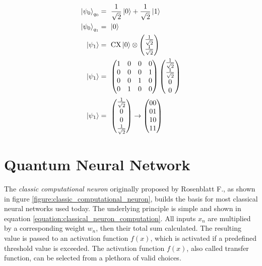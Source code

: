 \begin{equation}
    \centering
    \begin{split}
    \ket{\psi_0}_{q_0} &=\ \frac{1}{\sqrt{2}}\ket{0} + \frac{1}{\sqrt{2}}\ket{1}\\
    \ket{\psi_0}_{q_1} &=\ \ket{0}\\
    \ket{\psi_1} &=\ \mathrm{CX}\ket{0}\otimes\begin{pmatrix}\frac{1}{\sqrt{2}} \\ \frac{1}{\sqrt{2}}\end{pmatrix} \\
    \ket{\psi_1} &=\ \begin{pmatrix}
    1 & 0 & 0 & 0\\
    0 & 0 & 0 & 1\\
    0 & 0 & 1 & 0\\
    0 & 1 & 0 & 0\\
    \end{pmatrix}\begin{pmatrix}\frac{1}{\sqrt{2}} \\ \frac{1}{\sqrt{2}} \\ 0 \\ 0\end{pmatrix} \\
    \ket{\psi_1} &=\ \begin{pmatrix}\frac{1}{\sqrt{2}} \\ 0 \\ 0 \\ \frac{1}{\sqrt{2}}\end{pmatrix} \rightarrow \begin{pmatrix}00 \\ 01 \\ 10 \\ 11\end{pmatrix}
    \end{split}
    \label{equation:states_cx_circuit}
\end{equation}




\newpage

\section{Quantum Neural Network}
\label{chapter:qnn}

The \textit{classic computational neuron} originally proposed by Rosenblatt F.\cite{rosenblatt_perceptron_1958}, as shown in figure \ref{figure:classic_computational_neuron}, builds the basis for most classical neural networks used today. The underlying principle is simple and shown in equation \ref{equation:classical_neuron_computation}. All inputs $x_n$ are multiplied by a corresponding weight $w_n$, then their total sum calculated. The resulting value is passed to an activation function $f(x)$, which is activated if a predefined threshold value is exceeded. The activation function $f(x)$, also called transfer function, can be selected from a plethora of valid choices\cite{szandala_review_2021}.

